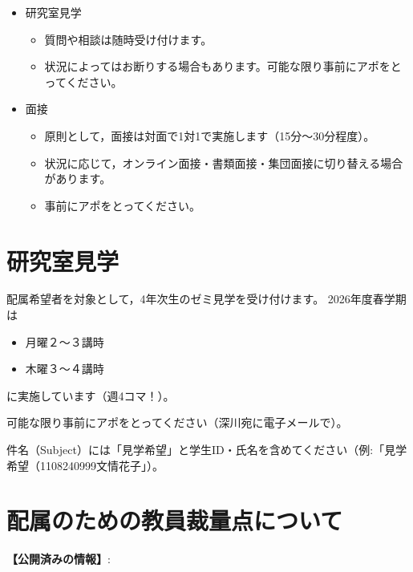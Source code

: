 \documentclass[paper=a4paper,fontsize=10.4pt]{jlreq}
\begin{document}
\begin{itemize}[topsep=0pt]
  \item 研究室見学
    \begin{itemize}
      \item 質問や相談は随時受け付けます。
      \item 状況によってはお断りする場合もあります。可能な限り事前にアポをとってください。
    \end{itemize}
  \item 面接
    \begin{itemize}
      \item 原則として，面接は対面で1対1で実施します（15分～30分程度）。
      \item 状況に応じて，オンライン面接・書類面接・集団面接に切り替える場合があります。
      \item 事前にアポをとってください。
    \end{itemize}
\end{itemize}

\section{研究室見学}

配属希望者を対象として，4年次生のゼミ見学を受け付けます。
2026年度春学期は
\begin{itemize}
\item 月曜２～３講時
\item 木曜３～４講時
\end{itemize}
に実施しています（週4コマ！）。

可能な限り事前にアポをとってください（深川宛に電子メールで）。

件名（Subject）には「見学希望」と学生ID・氏名を含めてください（例:「見学希望（1108240999文情花子」）。

\section{配属のための教員裁量点について}

\noindent
{\bfseries 【公開済みの情報】}:\\

\medskip
\end{document}

